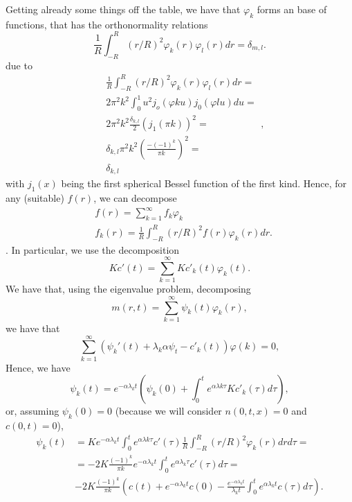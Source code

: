 \documentclass[]{article}
\begin{document}
Getting already some things off the table, we have that $\varphi_k$ forms an base of functions, that has the orthonormality relations
\begin{equation}\label{orthonomalityrelations}
\frac{1}{R} \int_{-R}^R (r/R)^2 \varphi_k(r) \varphi_l(r) dr = \delta_{m,l}.
\end{equation} 
due to
\begin{equation}
\begin{split}
& \frac{1}{R} \int_{-R}^R (r/R)^2 \varphi_k(r) \varphi_l(r) dr = \\
& 2 \pi^2 k^2 \int_{0}^1 u^2 j_o(\varphi k u) j_0(\varphi l u) du = \\
& 2 \pi^2 k^2 \frac{\delta_{k,l}}{2} (j_1(\pi k))^2 = \\
& \delta_{k,l} \pi^2 k^2 \left(\frac{-(-1)^k}{\pi k}\right)^2 = \\
& \delta_{k,l}
\end{split},
\end{equation}
with $j_1(x)$ being the first spherical Bessel function of the first kind. Hence, for any (suitable) $f(r)$, we can decompose
\begin{equation}
\begin{split}
& f(r) = \sum_{k=1}^\infty f_k \varphi_k \\
& f_k(r) = \frac{1}{R} \int_{-R}^R (r/R)^2 f(r) \varphi_k(r) dr.
\end{split}
\end{equation}.
In particular, we use the decomposition
\begin{equation}
K c'(t) = \sum_{k=1}^\infty K c'_k(t) \varphi_k(t).
\end{equation}
We have that, using the eigenvalue problem, decomposing
\begin{equation}
m(r,t) = \sum_{k=1}^\infty \psi_k(t) \varphi_k(r),
\end{equation}
we have that 
\begin{equation}
\sum_{k=1}^{\infty} \left(\psi_k'(t) + \lambda_k \alpha \psi_t - c'_k(t) \right) \varphi(k) = 0,
\end{equation}
Hence, we have
\begin{equation}
\psi_k(t) = e^{-\alpha \lambda_k t} \left(\psi_k(0) + \int_0^t e^{\alpha \lambda k \tau} K c'_k(\tau) d \tau \right),
\end{equation}
or, assuming $\psi_k(0) = 0$ (because we will consider $n(0,t,x) = 0$ and $c(0,t) = 0$), 
\begin{equation}\label{phikdefinitions}
\begin{split}
\psi_k(t) & = K e^{-\alpha \lambda_k t} \int_0^t e^{\alpha \lambda k \tau} c'(\tau) \frac{1} R \int_{-R}^R (r/R)^2 \varphi_k(r) dr d \tau = \\
& = -2 K \frac{(-1)^k}{\pi k} e^{-\alpha \lambda_k t} \int_0^t e^{\alpha \lambda_k \tau} c'(\tau) d \tau = \\
& -2 K \frac{(-1)^k}{\pi k} \left(c(t) + e^{-\alpha \lambda_k t} c(0) - \frac{e^{-\alpha \lambda_k t}}{\lambda_k t} \int_0^t e^{\alpha \lambda_k t} c(\tau) d\tau \right).
\end{split}
\end{equation}
\end{document}
